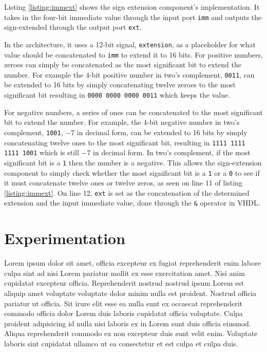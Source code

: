 \documentclass[11pt]{report}
\begin{document}

Listing \ref{listing:immext} shows the sign extension component's implementation. It takes in the
four-bit immediate value through the input port \verb|imm| and outputs the sign-extended through the
output port \verb|ext|.

In the architecture, it uses a 12-bit signal, \verb|extension|, as a placeholder for what value
should be concatenated to \verb|imm| to extend it to 16 bits. For positive numbers, zeroes can
simply be concatenated as the most significant bit to extend the number. For example the 4-bit
positive number in two's complement, \verb|0011|, can be extended to 16 bits by simply concatenating
twelve zeroes to the most significant bit resulting in \verb|0000 0000 0000 0011| which keeps the
value.

For negative numbers, a series of ones can be concatenated to the most significant bit to extend the
number. For example, the 4-bit negative number in two's complement, \verb|1001|, $-7$ in decimal
form, can be extended to 16 bits by simply concatenating twelve ones to the most significant bit,
resulting in \verb|1111 1111 1111 1001| which is still $-7$ in decimal form. In two's complement, if
the most significant bit is a \verb|1| then the number is a negative. This allows the sign-extension
component to simply check whether the most significant bit is a \verb|1| or a \verb|0| to see if it
must concatenate twelve ones or twelve zeros, as seen on line 11 of listing \ref{listing:immext}. On
line 12, \verb|ext| is set as the concatenation of the determined extension and the input immediate
value, done through the \verb|&| operator in VHDL.

\newpage

\section*{Experimentation}
Lorem ipsum dolor sit amet, officia excepteur ex fugiat reprehenderit enim labore culpa sint ad nisi
Lorem pariatur mollit ex esse exercitation amet. Nisi anim cupidatat excepteur officia.
Reprehenderit nostrud nostrud ipsum Lorem est aliquip amet voluptate voluptate dolor minim nulla est
proident. Nostrud officia pariatur ut officia. Sit irure elit esse ea nulla sunt ex occaecat
reprehenderit commodo officia dolor Lorem duis laboris cupidatat officia voluptate. Culpa proident
adipisicing id nulla nisi laboris ex in Lorem sunt duis officia eiusmod. Aliqua reprehenderit
commodo ex non excepteur duis sunt velit enim. Voluptate laboris sint cupidatat ullamco ut ea
consectetur et est culpa et culpa duis.
\end{document}
